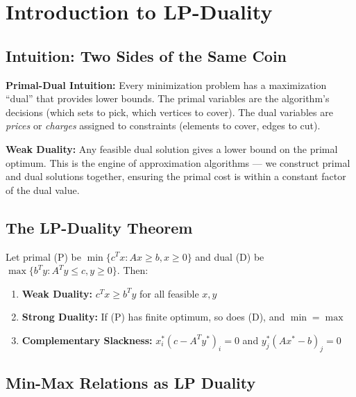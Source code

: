 \setcounter{chapter}{11}
\chapter{Introduction to LP-Duality}
\label{ch:lp_duality}

\section{Intuition: Two Sides of the Same Coin}

\begin{intuitionbox}
\textbf{Primal-Dual Intuition:} Every minimization problem has a maximization ``dual'' that provides lower bounds. The primal variables are the algorithm's decisions (which sets to pick, which vertices to cover). The dual variables are \emph{prices} or \emph{charges} assigned to constraints (elements to cover, edges to cut).

\textbf{Weak Duality:} Any feasible dual solution gives a lower bound on the primal optimum. This is the engine of approximation algorithms — we construct primal and dual solutions together, ensuring the primal cost is within a constant factor of the dual value.
\end{intuitionbox}

\section{The LP-Duality Theorem}

\begin{theorem}[LP Duality]
Let primal (P) be $\min \{c^T x : Ax \geq b, x \geq 0\}$ and dual (D) be $\max \{b^T y : A^T y \leq c, y \geq 0\}$. Then:
\begin{enumerate}
    \item \textbf{Weak Duality:} $c^T x \geq b^T y$ for all feasible $x, y$
    \item \textbf{Strong Duality:} If (P) has finite optimum, so does (D), and $\min = \max$
    \item \textbf{Complementary Slackness:} $x_i^* (c - A^T y^*)_i = 0$ and $y_j^* (A x^* - b)_j = 0$
\end{enumerate}
\end{theorem}

\section{Min-Max Relations as LP Duality}

